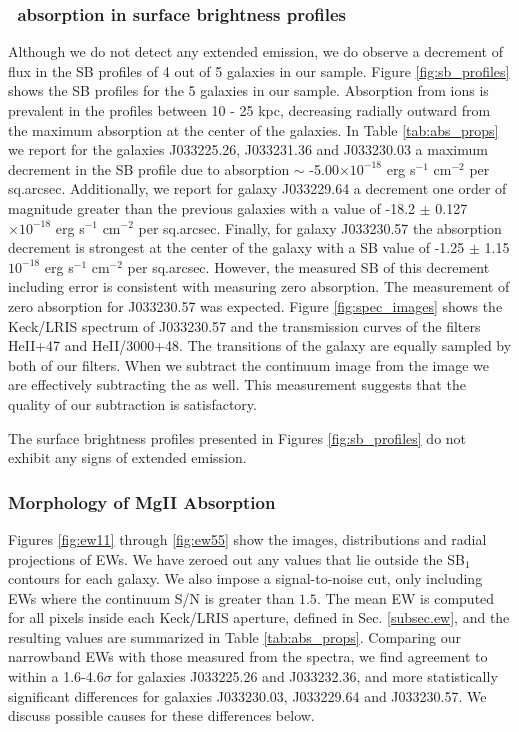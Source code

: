 \documentclass[twocolumn]{aastex61}
\begin{document}
\subsubsection{\ absorption in surface brightness profiles}
Although we do not detect any extended  emission, we do observe a decrement of flux in the SB profiles of 4 out of 5 galaxies in our sample. Figure \ref{fig:sb_profiles} shows the SB profiles for the 5 galaxies in our sample. Absorption from  ions is prevalent in the profiles between 10 - 25 kpc, decreasing radially outward from the maximum absorption at the center of the galaxies. In Table \ref{tab:abs_props} we report for the galaxies J033225.26, J033231.36 and J033230.03 a maximum decrement in the SB profile due to absorption $\sim$ -5.00$\times10^{-18}$ erg s$^{-1}$ cm$^{-2}$ per sq.arcsec. Additionally, we report for galaxy J033229.64 a decrement one order of magnitude greater than the previous galaxies with a value of -18.2 $\pm$ 0.127 $\times10^{-18}$ erg s$^{-1}$ cm$^{-2}$ per sq.arcsec. Finally, for galaxy J033230.57 the absorption decrement is strongest at the center of the galaxy with a SB value of -1.25 $\pm$ 1.15 $10^{-18}$ erg s$^{-1}$ cm$^{-2}$ per sq.arcsec. However, the measured SB of this decrement including error is consistent with measuring zero absorption. The measurement of zero absorption for J033230.57 was expected. Figure \ref{fig:spec_images} shows the Keck/LRIS spectrum of J033230.57 and the transmission curves of the filters HeII+47 and HeII/3000+48. The  transitions of the galaxy are equally sampled by both of our filters. When we subtract the continuum image from the  image we are effectively subtracting the  as well. This measurement suggests that the quality of our subtraction is satisfactory.  

The surface brightness profiles presented in Figures \ref{fig:sb_profiles} do not exhibit any signs of extended  emission.

\subsubsection{Morphology of MgII Absorption}
Figures \ref{fig:ew11} through \ref{fig:ew55} show the images, distributions and radial projections of  EWs. We have zeroed out any values that lie outside the SB$_1$ contours for each galaxy. We also impose a signal-to-noise cut, only including EWs where the continuum S/N is greater than $1.5$. The mean EW is computed for all pixels inside each Keck/LRIS aperture, defined in Sec. \ref{subsec.ew}, and the resulting values are summarized in Table \ref{tab:abs_props}. Comparing our narrowband EWs with those measured from the spectra, we find agreement to within a 1.6-4.6$\sigma$ for galaxies J033225.26 and J033232.36, and more statistically significant differences for galaxies J033230.03, J033229.64 and J033230.57.  We discuss possible causes for these differences below.
\end{document}
